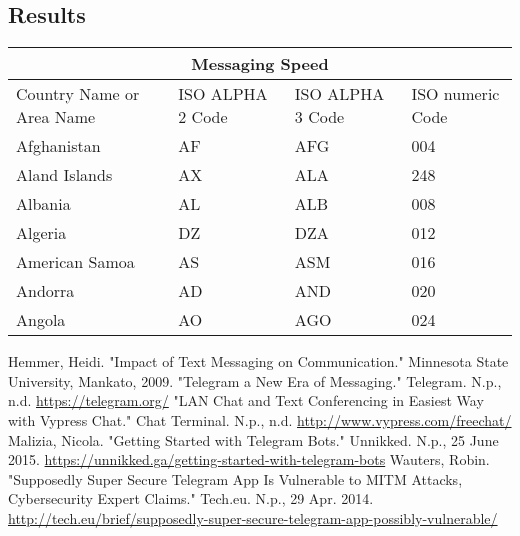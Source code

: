 \documentclass[twoside]{article}
\begin{document}
\begin{multicols}{2}
\subsection{Results}
\begin{tabular}{ |p{3cm}||p{3cm}|p{3cm}|p{3cm}|  }
 \hline
 \multicolumn{4}{|c|}{Messaging Speed} \\
 \hline
 Country Name     or Area Name& ISO ALPHA 2 Code &ISO ALPHA 3 Code&ISO numeric Code\\
 \hline
 Afghanistan   & AF    &AFG&   004\\
 Aland Islands&   AX  & ALA   &248\\
 Albania &AL & ALB&  008\\
 Algeria    &DZ & DZA&  012\\
 American Samoa&   AS  & ASM&016\\
 Andorra& AD  & AND   &020\\
 Angola& AO  & AGO&024\\
 \hline
\end{tabular}
\begin{thebibliography}{99} %
Hemmer, Heidi. "Impact of Text Messaging on Communication." Minnesota State University, Mankato, 2009.
"Telegram  a New Era of Messaging." Telegram. N.p., n.d.  \href{https://telegram.org/}{https://telegram.org/}
"LAN Chat and Text Conferencing in Easiest Way with Vypress Chat." Chat Terminal. N.p., n.d.  \href{http://www.vypress.com/free\textunderscore chat/}{http://www.vypress.com/free\textunderscore chat/}
Malizia, Nicola. "Getting Started with Telegram Bots." Unnikked. N.p., 25 June 2015. \href{https://unnikked.ga/getting-started-with-telegram-bots}{https://unnikked.ga/getting-started-with-telegram-bots}
Wauters, Robin. "Supposedly Super Secure Telegram App Is Vulnerable to MITM Attacks, Cybersecurity Expert Claims." Tech.eu. N.p., 29 Apr. 2014.  \href{http://tech.eu/brief/supposedly-super-secure-telegram-app-possibly-vulnerable/}{http://tech.eu/brief/supposedly-super-secure-telegram-app-possibly-vulnerable/} 

\end{thebibliography}


\end{multicols}
\end{document}
